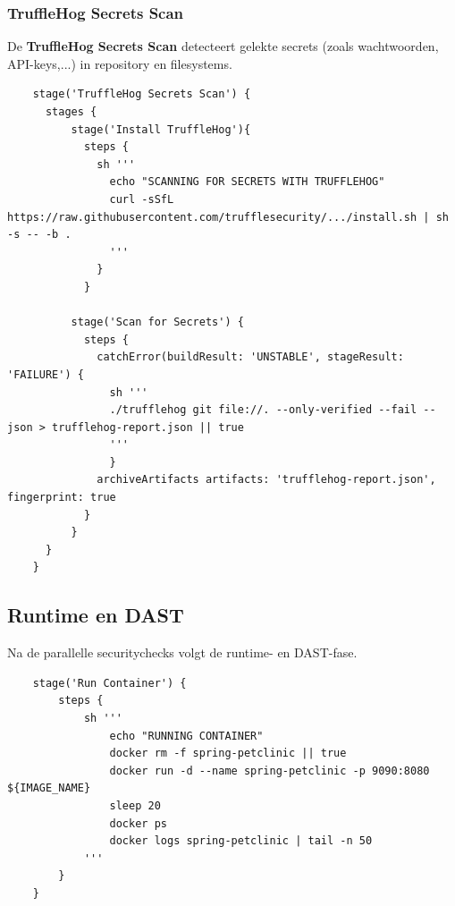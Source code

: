 \subsubsection{TruffleHog Secrets Scan}
De \textbf{TruffleHog Secrets Scan} detecteert gelekte secrets (zoals wachtwoorden, API-keys,...) in repository en filesystems.

\begin{listing}[h]
    \caption{Secrets scanning met TruffleHog}
    \label{lst:jenkins-trufflehog}
    \begin{verbatim}
    stage('TruffleHog Secrets Scan') {
      stages {
          stage('Install TruffleHog'){
            steps {
              sh '''
                echo "SCANNING FOR SECRETS WITH TRUFFLEHOG"
                curl -sSfL https://raw.githubusercontent.com/trufflesecurity/.../install.sh | sh -s -- -b .
                '''
              }
            }
            
          stage('Scan for Secrets') {
            steps {
              catchError(buildResult: 'UNSTABLE', stageResult: 'FAILURE') {
                sh '''
                ./trufflehog git file://. --only-verified --fail --json > trufflehog-report.json || true
                '''
                }
              archiveArtifacts artifacts: 'trufflehog-report.json', fingerprint: true
            }
          }
      }
    }
    \end{verbatim}
\end{listing}
\FloatBarrier
\subsection{Runtime en DAST}

Na de parallelle securitychecks volgt de runtime- en DAST-fase.

\begin{listing}[h]
    \caption{Run container}
    \label{lst:Run-container}
    \begin{verbatim}
    stage('Run Container') {
        steps {
            sh '''
                echo "RUNNING CONTAINER"
                docker rm -f spring-petclinic || true
                docker run -d --name spring-petclinic -p 9090:8080 ${IMAGE_NAME}
                sleep 20
                docker ps
                docker logs spring-petclinic | tail -n 50
            '''
        }
    }
\end{verbatim}
\end{listing}

